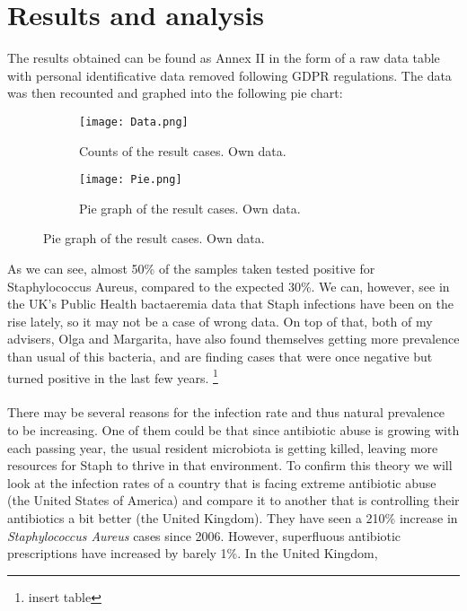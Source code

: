\section{Results and analysis}
The results obtained can be found as Annex II in the form of a raw data table with personal identificative data removed following GDPR regulations. The data was then recounted and graphed into the following pie chart: 
\begin{center}\begin{figure}[h!]  \centering\begin{subfigure}[b]{0.4\linewidth}\texttt{[image: Data.png]}\caption{Counts of the result cases. Own data.}\end{subfigure}\begin{subfigure}[b]{0.4\linewidth}\texttt{[image: Pie.png]}\caption{Pie graph of the result cases. Own data.}\end{subfigure}\end{figure}\end{center}
As we can see, almost 50\% of the samples taken tested positive for Staphylococcus Aureus, compared to the expected 30\%\cite{StaphylococcusAureusHealthcare2020}. We can, however, see in the UK's Public Health bactaeremia data that Staph infections have been on the rise lately, so it may not be a case of wrong data\cite{englandMSSABacteraemiaAnnual2021}. On top of that, both of my advisers, Olga and Margarita, have also found themselves getting more prevalence than usual of this bacteria, and are finding cases that were once negative but turned positive in the last few years. \footnote{insert table}
\paragraph{}There may be several reasons for the infection rate and thus natural prevalence to be increasing. One of them could be that since antibiotic abuse is growing with each passing year, the usual resident microbiota is getting killed, leaving more resources for Staph to thrive in that environment. To confirm this theory we will look at the infection rates of a country that is facing extreme antibiotic abuse (the United States of America) and compare it to another that is controlling their antibiotics a bit better (the United Kingdom). They have seen a 210\% increase in \emph{Staphylococcus Aureus} cases since 2006. However, superfluous antibiotic prescriptions have increased by barely 1\%\cite{baggsEstimatingNationalTrends2016}. In the United Kingdom,
